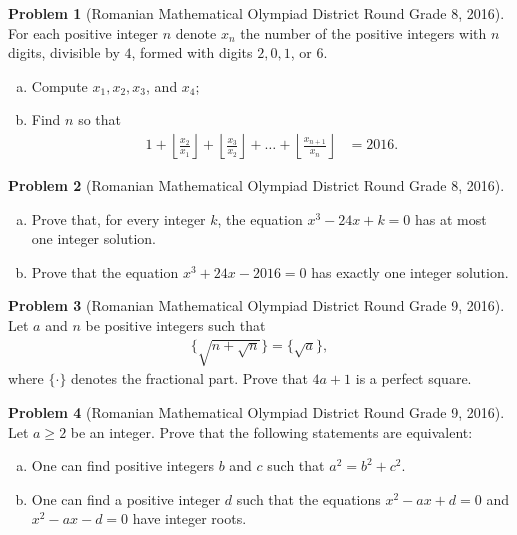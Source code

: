 \documentclass[]{article}
\theoremstyle{definition}
\newtheorem{problem}{Problem}
\begin{document}
\begin{problem}[Romanian Mathematical Olympiad District Round Grade 8, 2016]
	For each positive integer $n$ denote $x_n$ the number of the positive
	integers with $n$ digits, divisible by $4$, formed with digits $2, 0, 1$, or $6$.
		\begin{enumerate}[(a)]
			\item Compute $x_1, x_2, x_3$, and $x_4$;
			\item Find $n$ so that
				\begin{align*}
					1 + \left\lfloor \frac{x_2}{x_1}\right\rfloor + \left\lfloor \frac{x_3}{x_2}\right\rfloor + \dots + \left\lfloor \frac{x_{n+1}}{x_n}\right\rfloor &= 2016.
				\end{align*}
		\end{enumerate}
\end{problem}




\begin{problem}[Romanian Mathematical Olympiad District Round Grade 8, 2016]
	$ $
	\begin{enumerate}[(a)]
		\item Prove that, for every integer $k$, the equation $x^3 - 24x + k = 0$ has at most one integer solution.
		\item Prove that the equation $x^3 + 24x - 2016 = 0$ has exactly one integer solution.
	\end{enumerate}
\end{problem}



\begin{problem}[Romanian Mathematical Olympiad District Round Grade 9, 2016]
	Let $a$ and $n$ be positive integers such that
		\begin{align*}
			\Bigg\{ \sqrt{n + \sqrt{n}}\Bigg\} = \big\{\sqrt a\big\},
		\end{align*}
	where $\{ \cdot \}$ denotes the fractional part. Prove that $4a+1$ is a perfect square.
\end{problem}



\begin{problem}[Romanian Mathematical Olympiad District Round Grade 9, 2016]
	Let $a \geq 2$ be an integer. Prove that the following statements are equivalent:
		\begin{enumerate}[(a)]
			\item One can find positive integers $b$ and $c$ such that $a^2 = b^2 + c^2$.
			\item One can find a positive integer $d$ such that the equations $x^2 - ax + d = 0$ and $x^2 - ax - d = 0$ have integer roots.
		\end{enumerate}
\end{problem}
\end{document}
